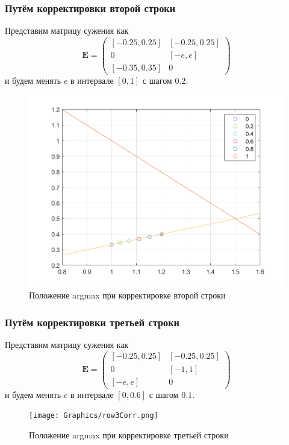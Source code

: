 \subsubsection{Путём корректировки второй строки}
Представим матрицу сужения как
\begin{equation}
    \mathbf{E}=
    \begin{pmatrix}
[-0.25, 0.25]  &  [-0.25, 0.25] \\
0  &  [-e, e] \\
[-0.35, 0.35]  &  0
\end{pmatrix}
\end{equation}
и будем менять $e$ в интервале $[0, 1]$ с шагом $0.2$.
\begin{figure}[H]
\centering
\includegraphics[width=\textwidth]{Graphics/row2Corr.png}
\caption{Положение argmax при корректировке второй строки} 
\end{figure}
\subsubsection{Путём корректировки третьей строки}
Представим матрицу сужения как
\begin{equation}
    \mathbf{E}=
    \begin{pmatrix}
[-0.25, 0.25]  &  [-0.25, 0.25] \\
0  &  [-1, 1] \\
[-e, e]  &  0
\end{pmatrix}
\end{equation}
и будем менять $e$ в интервале $[0, 0.6]$ с шагом $0.1$.
\begin{figure}[H]
\centering
\texttt{[image: Graphics/row3Corr.png]}
\caption{Положение argmax при корректировке третьей строки} 
\end{figure}